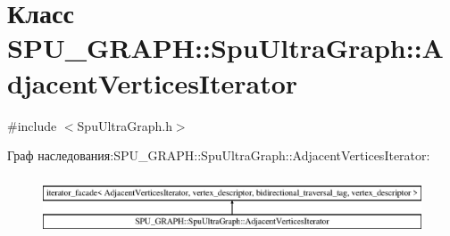 \hypertarget{class_s_p_u___g_r_a_p_h_1_1_spu_ultra_graph_1_1_adjacent_vertices_iterator}{}\section{Класс S\+P\+U\+\_\+\+G\+R\+A\+PH\+:\+:Spu\+Ultra\+Graph\+:\+:Adjacent\+Vertices\+Iterator}
\label{class_s_p_u___g_r_a_p_h_1_1_spu_ultra_graph_1_1_adjacent_vertices_iterator}


{\ttfamily \#include $<$Spu\+Ultra\+Graph.\+h$>$}

Граф наследования\+:S\+P\+U\+\_\+\+G\+R\+A\+PH\+:\+:Spu\+Ultra\+Graph\+:\+:Adjacent\+Vertices\+Iterator\+:\begin{figure}[H]
\begin{center}
\leavevmode
\includegraphics[height=1.744548cm]{class_s_p_u___g_r_a_p_h_1_1_spu_ultra_graph_1_1_adjacent_vertices_iterator}
\end{center}
\end{figure}
